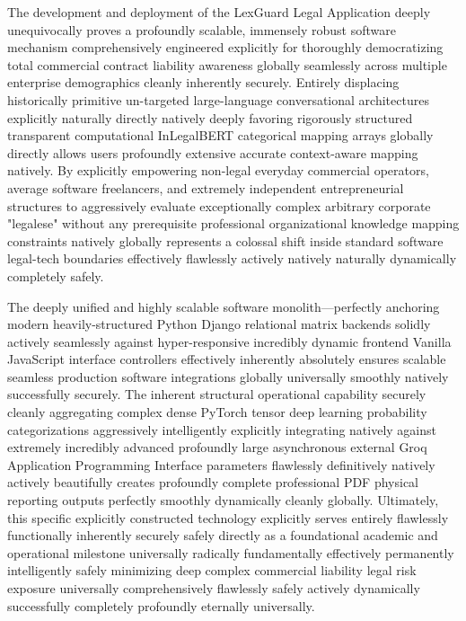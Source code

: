 \documentclass[a4paper,12pt]{report}
\begin{document}
The development and deployment of the LexGuard Legal Application deeply unequivocally proves a profoundly scalable, immensely robust software mechanism comprehensively engineered explicitly for thoroughly democratizing total commercial contract liability awareness globally seamlessly across multiple enterprise demographics cleanly inherently securely. Entirely displacing historically primitive un-targeted large-language conversational architectures explicitly naturally directly natively deeply favoring rigorously structured transparent computational InLegalBERT categorical mapping arrays globally directly allows users profoundly extensive accurate context-aware mapping natively. By explicitly empowering non-legal everyday commercial operators, average software freelancers, and extremely independent entrepreneurial structures to aggressively evaluate exceptionally complex arbitrary corporate "legalese" without any prerequisite professional organizational knowledge mapping constraints natively globally represents a colossal shift inside standard software legal-tech boundaries effectively flawlessly actively natively naturally dynamically completely safely.

The deeply unified and highly scalable software monolith—perfectly anchoring modern heavily-structured Python Django relational matrix backends solidly actively seamlessly against hyper-responsive incredibly dynamic frontend Vanilla JavaScript interface controllers effectively inherently absolutely ensures scalable seamless production software integrations globally universally smoothly natively successfully securely. The inherent structural operational capability securely cleanly aggregating complex dense PyTorch tensor deep learning probability categorizations aggressively intelligently explicitly integrating natively against extremely incredibly advanced profoundly large asynchronous external Groq Application Programming Interface parameters flawlessly definitively natively actively beautifully creates profoundly complete professional PDF physical reporting outputs perfectly smoothly dynamically cleanly globally. Ultimately, this specific explicitly constructed technology explicitly serves entirely flawlessly functionally inherently securely safely directly as a foundational academic and operational milestone universally radically fundamentally effectively permanently intelligently safely minimizing deep complex commercial liability legal risk exposure universally comprehensively flawlessly safely actively dynamically successfully completely profoundly eternally universally.
\end{document}
